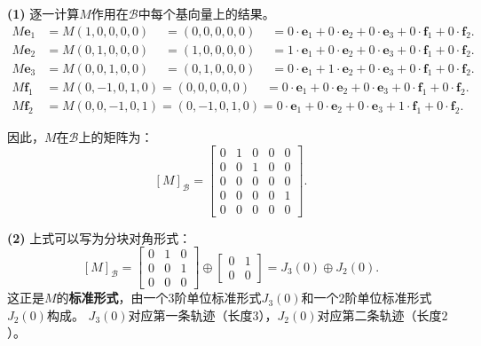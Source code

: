 \documentclass[12pt,UTF8,fontset=none]{ctexbook}
\begin{document}
\begin{so}
\textbf{(1)} 逐一计算$M$作用在$\mathcal{B}$中每个基向量上的结果。
\begin{align*}
    M\mathbf{e}_1 &= M(1,0,0,0,0) \phantom{-}= (0,0,0,0,0) \phantom{-}= 0\cdot\mathbf{e}_1 + 0\cdot\mathbf{e}_2 + 0\cdot\mathbf{e}_3 + 0\cdot\mathbf{f}_1 + 0\cdot\mathbf{f}_2.\\
    M\mathbf{e}_2 &= M(0,1,0,0,0) \phantom{-}= (1,0,0,0,0) \phantom{-}= 1\cdot\mathbf{e}_1 + 0\cdot\mathbf{e}_2 + 0\cdot\mathbf{e}_3 + 0\cdot\mathbf{f}_1 + 0\cdot\mathbf{f}_2.\\
    M\mathbf{e}_3 &= M(0,0,1,0,0) \phantom{-}= (0,1,0,0,0) \phantom{-}= 0\cdot\mathbf{e}_1 + 1\cdot\mathbf{e}_2 + 0\cdot\mathbf{e}_3 + 0\cdot\mathbf{f}_1 + 0\cdot\mathbf{f}_2.\\
    M\mathbf{f}_1 &= M(0,-1,0,1,0) = (0,0,0,0,0) \phantom{-}= 0\cdot\mathbf{e}_1 + 0\cdot\mathbf{e}_2 + 0\cdot\mathbf{e}_3 + 0\cdot\mathbf{f}_1 + 0\cdot\mathbf{f}_2.\\
    M\mathbf{f}_2 &= M(0,0,-1,0,1) = (0,-1,0,1,0) = 0\cdot\mathbf{e}_1 + 0\cdot\mathbf{e}_2 + 0\cdot\mathbf{e}_3 + 1\cdot\mathbf{f}_1 + 0\cdot\mathbf{f}_2.
\end{align*}

因此，$M$在$\mathcal{B}$上的矩阵为：
$$
[M]_{\mathcal{B}} = \begin{bmatrix}
0 & 1 & 0 & 0 & 0 \\
0 & 0 & 1 & 0 & 0 \\
0 & 0 & 0 & 0 & 0 \\
0 & 0 & 0 & 0 & 1 \\
0 & 0 & 0 & 0 & 0
\end{bmatrix}.
$$

\textbf{(2)} 上式可以写为分块对角形式：
$$
[M]_{\mathcal{B}} = \begin{bmatrix}
0 & 1 & 0 \\
0 & 0 & 1 \\
0 & 0 & 0
\end{bmatrix} \oplus \begin{bmatrix}
0 & 1 \\
0 & 0
\end{bmatrix} = J_3(0) \oplus J_2(0).
$$
这正是$M$的\textbf{标准形式}，由一个$3$阶单位标准形式$J_3(0)$和一个$2$阶单位标准形式$J_2(0)$构成。
$J_3(0)$对应第一条轨迹（长度$3$），$J_2(0)$对应第二条轨迹（长度$2$）。


\end{so}
\end{document}
